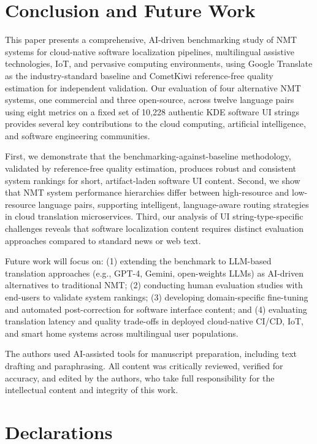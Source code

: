 \documentclass[pdflatex,sn-mathphys-num]{sn-jnl}
\begin{document}
\section{Conclusion and Future Work}

This paper presents a comprehensive, AI-driven benchmarking study of NMT systems for cloud-native software localization pipelines, multilingual assistive technologies, IoT, and pervasive computing environments, using Google Translate as the industry-standard baseline and CometKiwi reference-free quality estimation for independent validation. Our evaluation of four alternative NMT systems, one commercial and three open-source, across twelve language pairs using eight metrics on a fixed set of 10,228 authentic KDE software UI strings provides several key contributions to the cloud computing, artificial intelligence, and software engineering communities.

First, we demonstrate that the benchmarking-against-baseline methodology, validated by reference-free quality estimation, produces robust and consistent system rankings for short, artifact-laden software UI content. Second, we show that NMT system performance hierarchies differ between high-resource and low-resource language pairs, supporting intelligent, language-aware routing strategies in cloud translation microservices. Third, our analysis of UI string-type-specific challenges reveals that software localization content requires distinct evaluation approaches compared to standard news or web text.

Future work will focus on: (1) extending the benchmark to LLM-based translation approaches (e.g., GPT-4, Gemini, open-weights LLMs) as AI-driven alternatives to traditional NMT; (2) conducting human evaluation studies with end-users to validate system rankings; (3) developing domain-specific fine-tuning and automated post-correction for software interface content; and (4) evaluating translation latency and quality trade-offs in deployed cloud-native CI/CD, IoT, and smart home systems across multilingual user populations.

\backmatter


The authors used AI-assisted tools for manuscript preparation, including text drafting and paraphrasing. All content was critically reviewed, verified for accuracy, and edited by the authors, who take full responsibility for the intellectual content and integrity of this work.

\section*{Declarations}
\end{document}
